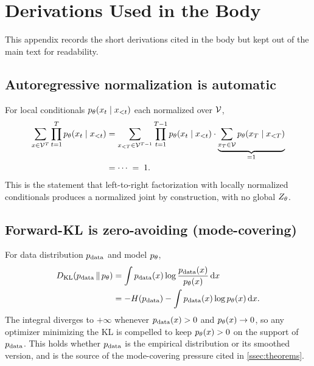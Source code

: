 
\section{Derivations Used in the Body}
\label{app:derivations}

This appendix records the short derivations cited in the body but kept out of the main text for readability.

\subsection{Autoregressive normalization is automatic}
\label{app:ar_norm}

For local conditionals $p_\theta(x_t \mid x_{<t})$ each normalized over $\mathcal{V}$,
\begin{align}
  \sum_{x \in \mathcal{V}^T} \prod_{t=1}^{T} p_\theta(x_t \mid x_{<t})
  &= \sum_{x_{<T} \in \mathcal{V}^{T-1}} \prod_{t=1}^{T-1} p_\theta(x_t \mid x_{<t}) \cdot \underbrace{\sum_{x_T \in \mathcal{V}} p_\theta(x_T \mid x_{<T})}_{=1} \\
  &= \cdots \;=\; 1.
\end{align}
This is the statement that left-to-right factorization with locally normalized conditionals produces a normalized joint by construction, with no global $Z_\theta$.

\subsection{Forward-KL is zero-avoiding (mode-covering)}
\label{app:mode_cover_proof}

For data distribution $p_{\mathrm{data}}$ and model $p_\theta$,
\begin{align}
  D_{\mathrm{KL}}(p_{\mathrm{data}} \,\|\, p_\theta)
  &= \int p_{\mathrm{data}}(x) \log \frac{p_{\mathrm{data}}(x)}{p_\theta(x)}\, \mathrm{d}x \\
  &= -H(p_{\mathrm{data}}) - \int p_{\mathrm{data}}(x) \log p_\theta(x)\, \mathrm{d}x.
\end{align}
The integral diverges to $+\infty$ whenever $p_{\mathrm{data}}(x) > 0$ and $p_\theta(x) \to 0$, so any optimizer minimizing the KL is compelled to keep $p_\theta(x) > 0$ on the support of $p_{\mathrm{data}}$.
This holds whether $p_{\mathrm{data}}$ is the empirical distribution or its smoothed version, and is the source of the mode-covering pressure cited in \cref{ssec:theorems}.

